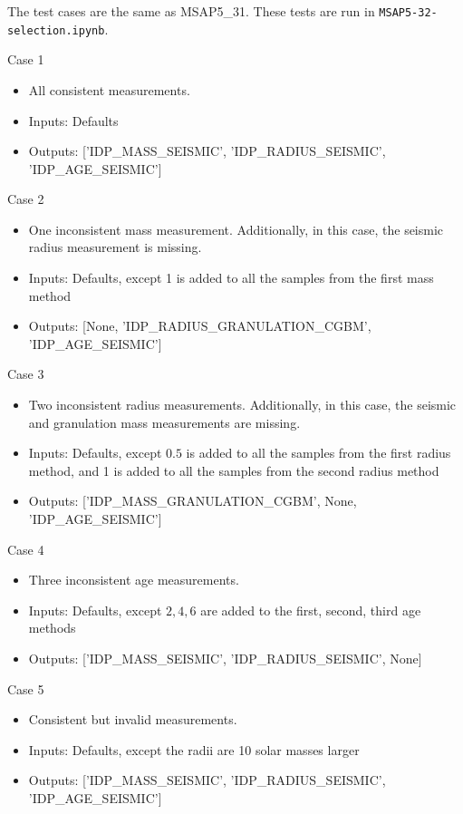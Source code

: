 \documentclass[a4paper, oneside, 11pt, article, english]{memoir}
\begin{document}
The test cases are the same as MSAP5\_31. These tests are run in \texttt{MSAP5-32-selection.ipynb}. 

Case 1
  \begin{itemize}
      \firmlist
      \item All consistent measurements. 
      \item Inputs: Defaults
      \item Outputs: ['IDP\_MASS\_SEISMIC', 'IDP\_RADIUS\_SEISMIC', 'IDP\_AGE\_SEISMIC']
  \end{itemize}

Case 2
  \begin{itemize}
      \firmlist
      \item One inconsistent mass measurement. Additionally, in this case, the seismic radius measurement is missing.
      \item Inputs: Defaults, except 1 is added to all the samples from the first mass method
      \item Outputs: [None, 'IDP\_RADIUS\_GRANULATION\_CGBM', 'IDP\_AGE\_SEISMIC']
  \end{itemize}

Case 3
  \begin{itemize}
      \firmlist
      \item Two inconsistent radius measurements. Additionally, in this case, the seismic and granulation mass measurements are missing. 
      \item Inputs: Defaults, except $0.5$ is added to all the samples from the first radius method, and 1 is added to all the samples from the second radius method
      \item Outputs: ['IDP\_MASS\_GRANULATION\_CGBM', None, 'IDP\_AGE\_SEISMIC']
  \end{itemize}

Case 4
  \begin{itemize}
      \firmlist
      \item Three inconsistent age measurements. 
      \item Inputs: Defaults, except $2,4,6$ are added to the first, second, third age methods 
      \item Outputs: ['IDP\_MASS\_SEISMIC', 'IDP\_RADIUS\_SEISMIC', None]
  \end{itemize}

Case 5
\begin{itemize}
    \firmlist
    \item Consistent but invalid measurements. 
     \item Inputs: Defaults, except the radii are 10 solar masses larger 
     \item Outputs: ['IDP\_MASS\_SEISMIC', 'IDP\_RADIUS\_SEISMIC', 'IDP\_AGE\_SEISMIC']
\end{itemize}
\end{document}
